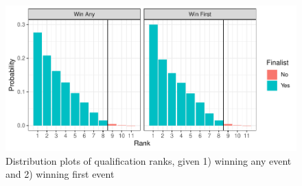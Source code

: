 \documentclass[12pt]{article}
\begin{document}
\begin{table}[H]

\caption{\label{tab:unnamed-chunk-6}This table shows every possible qualification rank obtained from simulations for a climber given that a they win at least one discipline or finish first in the first discipline. For each rank, information on the number of times that climbers finish at the given rank, the probability of finishing at exactly the given rank, and the probability of finishing at or below the given rank are included.}
\centering
{}
\end{table}

\begin{figure}

{\centering \includegraphics{draft_files/figure-latex/unnamed-chunk-7-1} 

}

\caption{Distribution plots of qualification ranks, given 1) winning any event and 2) winning first event}\label{fig:unnamed-chunk-7}
\end{figure}
\end{document}
